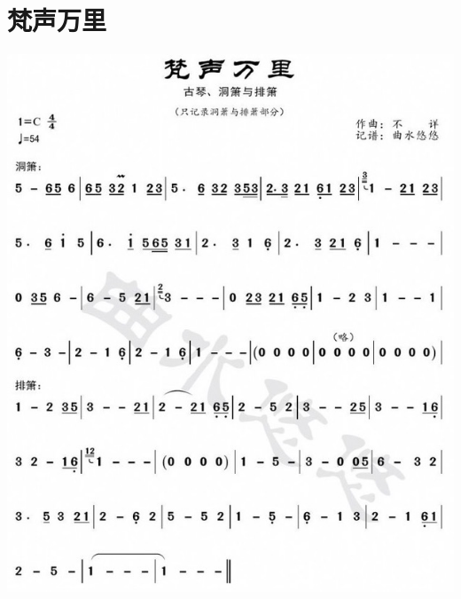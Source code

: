 \documentclass[cn,pad,twocol]{elegantbook}
\begin{document}
\section{梵声万里}  \includegraphics[width=\textwidth]{dongxiao/20200901-梵声万里.jpeg}
\end{document}
